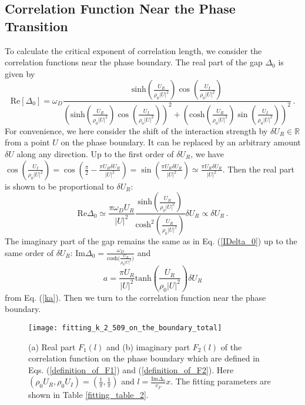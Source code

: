 \documentclass[aps,prl,twocolumn,superscriptaddress]{revtex4-1}
\begin{document}
\begin{bibunit}
\section{Correlation Function Near the Phase Transition}

To calculate the critical exponent of correlation length, we consider the correlation functions near the phase boundary.  The real part of the gap $\Delta_0$ is given by
\begin{equation}
	\text{Re} [\Delta_0] = \omega_D \frac{\text{sinh} \left( \frac{U_R}{\rho_0 |
			U |^2} \right) \cos \left( \frac{U_I}{ \rho_0 | U |^2}
		\right)}{\left( \text{sinh} \left( \frac{U_R}{\rho_0 | U |^2} \right)
		\cos \left( \frac{U_I}{ \rho_0 | U |^2} \right) \right)^2 + \left(
		\text{cosh} \left( \frac{U_R}{\rho_0 | U |^2} \right) \sin \left(
		\frac{U_I}{ \rho_0 | U |^2} \right) \right)^2}\,.\label{Real_gap}
\end{equation}
For convenience, we here consider the shift of the interaction strength by $\delta U_R\in\mathbb{R}$ from a point $U$ on the phase boundary. It can be replaced by an arbitrary amount $\delta U$ along any direction. Up to the first order of $\delta U_R$, we have $\cos \left(
\frac{U_I}{ \rho_0 | U |^2} \right) = \cos \left( \frac{\pi}{2}-\frac{\pi U_R\delta U_R}{|U|^2} \right)=\sin \left(\frac{\pi U_R\delta U_R}{|U|^2} \right) \simeq \frac{\pi U_R\delta U_R}{|U|^2}$. Then the real part is shown to be proportional to $\delta U_R$:
\begin{equation}
	\text{Re} \Delta_0 \simeq \frac{\pi\omega_D U_R}{| U |^2} \frac{\text{sinh}
		\left( \frac{U_R}{\rho_0 | U |^2} \right)}{\text{cosh}^2 \left(
		\frac{U_R}{\rho_0 | U |^2} \right)} \delta U_R \propto \delta U_R\,.
	\label{define_UR_deviation}
\end{equation}
The imaginary part of the gap remains the same as in Eq. (\ref{IDelta_0}) up to the same order of $\delta U_R$: $\text{Im} \Delta_0 =
\frac{\omega_D}{\text{cosh($\frac{U_R}{\rho_0 | U |^2}$)}}$ and   
\begin{equation}
	a=\frac{\pi U_R}{|U|^2}\text{tanh}(\frac{U_R}{\rho_0|U|^2})\delta U_R
	\label{detailed_expression_a}
\end{equation}
from Eq. (\ref{ka}). Then we turn to the correlation function near the phase boundary.

\begin{figure}
	\centering \texttt{[image: fitting\_k\_2\_509\_on\_the\_boundary\_total]}
	\caption{(a) Real part $F_1(l)$ and (b) imaginary part $F_2(l)$ of the correlation function on the phase boundary which are defined in Eqs. (\ref{definition_of_F1}) and (\ref{definition_of_F2}). Here $(\rho_{0}U_{R},\rho_{0}U_{I})=(\frac{1}{\pi},\frac{1}{\pi})$ and $l=\frac{\text{Im}\Delta_0}{v_F}x$. The fitting parameters are shown in Table \ref{fitting_table_2}.}
	\label{fig2}
\end{figure}


\end{bibunit}
\end{document}
